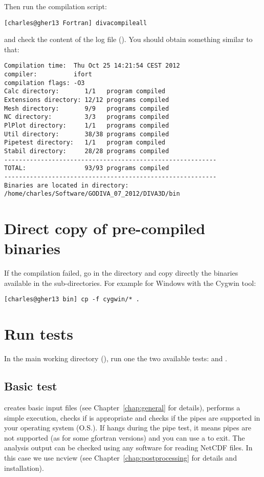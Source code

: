 Then run the compilation script: 
\begin{lstlisting}[style=Bash]
[charles@gher13 Fortran] divacompileall
\end{lstlisting}
and check the content of the log file (). You should obtain something similar to that:
\begin{verbatim}
Compilation time:  Thu Oct 25 14:21:54 CEST 2012
compiler:          ifort
compilation flags: -O3
Calc directory:       1/1   program compiled
Extensions directory: 12/12 programs compiled
Mesh directory:       9/9   programs compiled
NC directory:         3/3   programs compiled
PlPlot directory:     1/1   programs compiled
Util directory:       38/38 programs compiled
Pipetest directory:   1/1   program compiled
Stabil directory:     28/28 programs compiled
----------------------------------------------------------
TOTAL:                93/93 programs compiled
----------------------------------------------------------
Binaries are located in directory:
/home/charles/Software/GODIVA_07_2012/DIVA3D/bin
\end{verbatim}

\section{Direct copy of pre-compiled binaries}

If the compilation failed, go in the  directory and copy directly the binaries available in the sub-directories. For example for Windows with the Cygwin tool:
\begin{lstlisting}[style=Bash]
[charles@gher13 bin] cp -f cygwin/* .
\end{lstlisting}

\section{Run tests\label{sec:divatest}}

In the main working directory (), run one the two available tests:  and . 


\subsection{Basic test}


 creates basic input files (see Chapter~\ref{chap:general} for details), performs a simple \diva execution, checks if  is appropriate and checks if the pipes are supported in your operating system (O.S.). If  hangs during the pipe test, it means pipes are not supported (as for some gfortran versions) and you can use a  to exit. The analysis output can be checked using any software for reading NetCDF files. In this case we use ncview (see Chapter~\ref{chap:postprocessing} for details and installation). 

